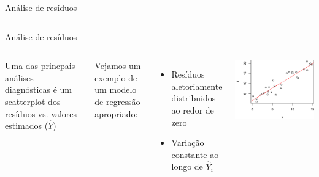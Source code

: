 \documentclass{beamer}\usepackage[]{graphicx}\usepackage[]{color}
\newenvironment{knitrout}{}{} %
\renewenvironment{knitrout}{\setlength{\topsep}{0mm}}{}
\begin{document}
\begin{frame}{Análise de resíduos}
\begin{columns}[t]
\begin{knitrout}
\end{knitrout}
\end{columns}


\end{frame}


\begin{frame}{Análise de resíduos}

\begin{columns}[c]

\small

Uma das princpais análises diagnósticas é um scatterplot dos resíduos vs.  valores estimados ($\hat Y$) 

\bigskip

Vejamos um exemplo de um modelo de regressão apropriado:
\begin{itemize}
\item Resíduos aletoriamente distribuidos ao redor de zero
\item Variação constante ao longo de $\hat{Y}_i$
\end{itemize}


\begin{knitrout}
\color{fgcolor}
\includegraphics[width=1\linewidth]{figure/r2-1} 


\end{knitrout}
\end{columns}
\end{frame}
\end{document}
